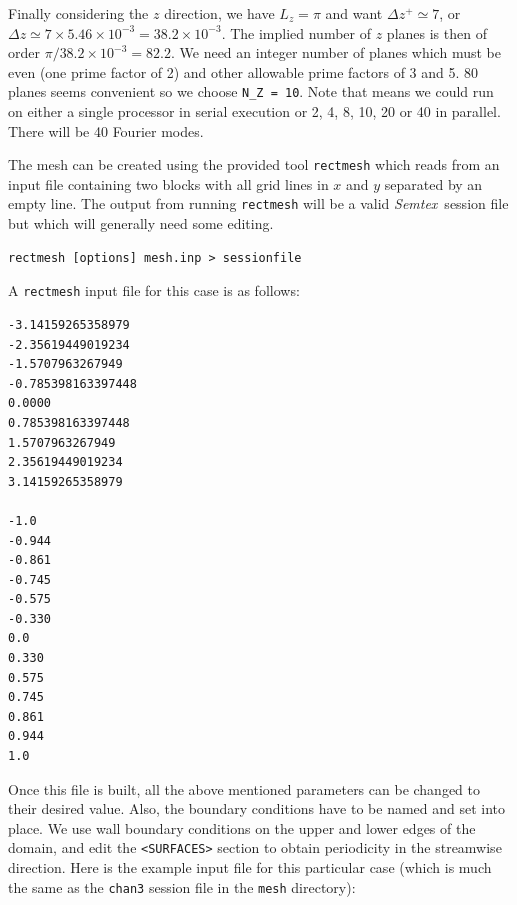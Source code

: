 \documentclass[11pt]{report}
\newcommand{\Semtex}{\emph{Semtex}} \newcommand{\Dog}{\emph{Dog}}
\begin{document}
Finally considering the $z$ direction, we have $L_z=\pi$ and want
$\Delta z^+\simeq7$, or $\Delta
z\simeq7\times5.46\times10^{-3}=38.2\times10^{-3}$.  The implied
number of $z$ planes is then of order $\pi/38.2\times10^{-3}=82.2$.
We need an integer number of planes which must be even (one prime
factor of 2) and other allowable prime factors of 3 and 5.  80 planes
seems convenient so we choose \verb|N_Z = 10|.  Note that means we
could run on either a single processor in serial execution or 2, 4, 8,
10, 20 or 40 in parallel.  There will be 40 Fourier modes.


The mesh can be created using the provided tool \texttt{rectmesh}
which reads from an input file containing two blocks with all grid
lines in $x$ and $y$ separated by an empty line. The output from
running \verb|rectmesh| will be a valid \Semtex\ session file but which
will generally need some editing. 

{\small
\begin{verbatim}
rectmesh [options] mesh.inp > sessionfile
\end{verbatim}
}

A \verb|rectmesh| input file for this case is as follows: {\small
\begin{verbatim}
-3.14159265358979
-2.35619449019234
-1.5707963267949
-0.785398163397448
0.0000
0.785398163397448
1.5707963267949
2.35619449019234
3.14159265358979

-1.0
-0.944
-0.861
-0.745
-0.575
-0.330
0.0
0.330
0.575
0.745
0.861
0.944
1.0
\end{verbatim}
}

Once this file is built, all the above mentioned parameters can be
changed to their desired value. Also, the boundary conditions have to
be named and set into place.  We use wall boundary conditions on the
upper and lower edges of the domain, and edit the \verb|<SURFACES>|
section to obtain periodicity in the streamwise direction. Here is the
example input file for this particular case (which is much the same as
the \verb|chan3| session file in the \verb |mesh| directory):
\end{document}
